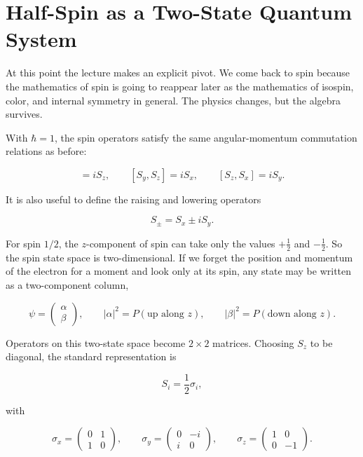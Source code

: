 \section{Half-Spin as a Two-State Quantum System}

At this point the lecture makes an explicit pivot. We come back to spin because the mathematics of spin is going to reappear later as the mathematics of isospin, color, and internal symmetry in general. The physics changes, but the algebra survives.

With \(\hbar=1\), the spin operators satisfy the same angular-momentum commutation relations as before:

\begin{equation}
[S_x,S_y]=iS_z,\qquad [S_y,S_z]=iS_x,\qquad [S_z,S_x]=iS_y.
\end{equation}

It is also useful to define the raising and lowering operators

\begin{equation}
S_\pm = S_x \pm i S_y.
\end{equation}

For spin \(1/2\), the \(z\)-component of spin can take only the values \(+\tfrac12\) and \(-\tfrac12\). So the spin state space is two-dimensional. If we forget the position and momentum of the electron for a moment and look only at its spin, any state may be written as a two-component column,

\begin{equation}
\psi =
\begin{pmatrix}
\alpha\\
\beta
\end{pmatrix},
\qquad
|\alpha|^2 = P(\text{up along }z),
\qquad
|\beta|^2 = P(\text{down along }z).
\end{equation}

Operators on this two-state space become \(2\times2\) matrices. Choosing \(S_z\) to be diagonal, the standard representation is

\begin{equation}
S_i=\frac12 \sigma_i,
\end{equation}

with

\begin{equation}
\sigma_x=
\begin{pmatrix}
0&1\\
1&0
\end{pmatrix},
\qquad
\sigma_y=
\begin{pmatrix}
0&-i\\
i&0
\end{pmatrix},
\qquad
\sigma_z=
\begin{pmatrix}
1&0\\
0&-1
\end{pmatrix}.
\end{equation}

